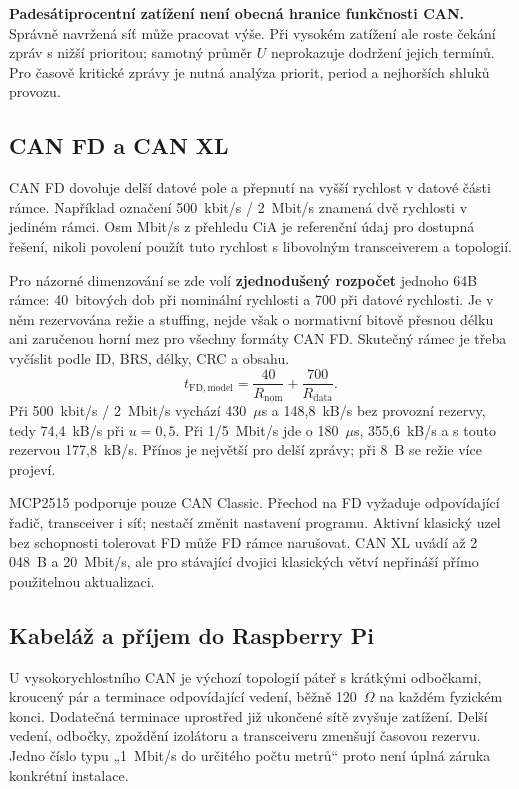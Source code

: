 \documentclass[11pt,a4paper]{article}
\begin{document}
\textbf{Padesátiprocentní zatížení není obecná hranice funkčnosti CAN.} Správně navržená síť může pracovat výše. Při vysokém zatížení ale roste čekání zpráv s nižší prioritou; samotný průměr $U$ neprokazuje dodržení jejich termínů. Pro časově kritické zprávy je nutná analýza priorit, period a nejhorších shluků provozu.

\subsection{CAN FD a CAN XL}
CAN FD dovoluje delší datové pole a přepnutí na vyšší rychlost v datové části rámce. Například označení 500~kbit/s / 2~Mbit/s znamená dvě rychlosti v jediném rámci. Osm Mbit/s z přehledu CiA je referenční údaj pro dostupná řešení, nikoli povolení použít tuto rychlost s libovolným transceiverem a topologií.\cite{cia,boschfd}

Pro názorné dimenzování se zde volí \textbf{zjednodušený rozpočet} jednoho 64B rámce: 40~bitových dob při nominální rychlosti a 700 při datové rychlosti. Je v něm rezervována režie a stuffing, nejde však o normativní bitově přesnou délku ani zaručenou horní mez pro všechny formáty CAN FD. Skutečný rámec je třeba vyčíslit podle ID, BRS, délky, CRC a obsahu.
\begin{equation}
t_{\mathrm{FD,model}}=\frac{40}{R_{\mathrm{nom}}}+\frac{700}{R_{\mathrm{data}}}.
\end{equation}
Při 500~kbit/s / 2~Mbit/s vychází 430~$\mu$s a 148,8~kB/s bez provozní rezervy, tedy 74,4~kB/s při $u=0{,}5$. Při 1/5~Mbit/s jde o 180~$\mu$s, 355,6~kB/s a s touto rezervou 177,8~kB/s. Přínos je největší pro delší zprávy; při 8~B se režie více projeví.

MCP2515 podporuje pouze CAN Classic. Přechod na FD vyžaduje odpovídající řadič, transceiver i síť; nestačí změnit nastavení programu. Aktivní klasický uzel bez schopnosti tolerovat FD může FD rámce narušovat. CAN XL uvádí až 2\,048~B a 20~Mbit/s, ale pro stávající dvojici klasických větví nepřináší přímo použitelnou aktualizaci.\cite{mcp2515,cia,boschfd}

\subsection{Kabeláž a příjem do Raspberry Pi}
U vysokorychlostního CAN je výchozí topologií páteř s krátkými odbočkami, kroucený pár a terminace odpovídající vedení, běžně 120~$\Omega$ na každém fyzickém konci. Dodatečná terminace uprostřed již ukončené sítě zvyšuje zatížení. Delší vedení, odbočky, zpoždění izolátoru a transceiveru zmenšují časovou rezervu. Jedno číslo typu „1~Mbit/s do určitého počtu metrů“ proto není úplná záruka konkrétní instalace.\cite{canphysical}
\end{document}

